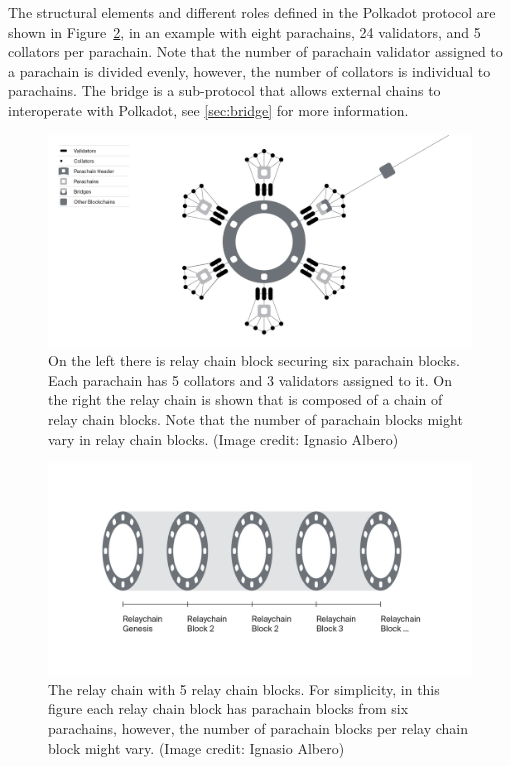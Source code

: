 The structural elements and different roles defined in the Polkadot protocol are shown in Figure~\ref{fig:roles}, in an example with eight parachains, 24 validators, and 5 collators per parachain. Note that the number of parachain validator assigned to a parachain is divided evenly, however, the number of collators is individual to parachains.  The bridge is a sub-protocol that allows external chains to interoperate with Polkadot, see \ref{sec:bridge} for more information. 
\begin{figure}[h]
	\centering
	\includegraphics[width=\textwidth]{images/Network@2x.png}
	\caption{On the left there is relay chain block securing six parachain blocks. Each parachain has  5 collators and 3 validators assigned to it. On the right the relay chain is shown that is composed of a chain of relay chain blocks. Note that the number of parachain blocks might vary in relay chain blocks.  (Image credit: Ignasio Albero)}
	\label{fig:roles}
\end{figure}
\begin{figure}[h]
	\centering
	\includegraphics[width=\textwidth]{images/Relaychain.png}
	\caption{The relay chain with 5 relay chain blocks. For simplicity, in this figure each relay chain block has parachain blocks from six parachains, however, the number of parachain blocks per relay chain block might vary.  (Image credit: Ignasio Albero)}
	\label{fig:roles}
\end{figure}

